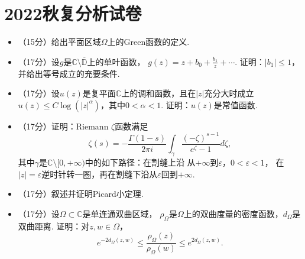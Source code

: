 \section{2022秋复分析试卷}
\begin{itemize}
    \item[1.] （15分）给出平面区域$\Omega$上的Green函数的定义.

    \item[2.] （17分）设$g$是$\mathbb{C}\setminus\overline{\mathbb{D}}$上的单叶函数，
    $g(z)=z+b_0+\frac{b_1}{z}+\cdots$. 
    证明：$|b_1|\leq1$，并给出等号成立的充要条件.

    \item[3.] （17分）设$u(z)$是复平面$\mathbb{C}$上的调和函数，且在$|z|$充分大时成立
    $u(z)\leq C\log(|z|^\alpha)$，其中$0<\alpha<1$. 证明：$u(z)$是常值函数.

    \item[4.] （17分）证明：Riemann $\zeta$函数满足
    $$\zeta(s)=-\frac{\Gamma(1-s)}{2\pi i}\int_\gamma
    \frac{(-\zeta)^{s-1}}{e^\zeta-1}d\zeta,$$
 	其中$\gamma$是$\mathbb{C}\setminus[0,+\infty)$中的如下路径：在割缝上沿
    从$+\infty$到$\varepsilon$，$0<\varepsilon<1$， 
 	在$|z|=\varepsilon$逆时针转一圈，再在割缝下沿从$\varepsilon$回到$+\infty$.

    \item[5.] （17分）叙述并证明Picard小定理.

    \item[6.] （17分）设$\Omega\subset\mathbb{C}$是单连通双曲区域，
    $\rho_\Omega$是$\Omega$上的双曲度量的密度函数，$d_\Omega$是双曲距离. 
    证明：对$z,w\in\Omega$，
    $$e^{-2d_\Omega(z,w)}\leq\frac{\rho_\Omega(z)}{\rho_\Omega(w)}
    \leq e^{2d_\Omega(z,w)}.$$
\end{itemize}